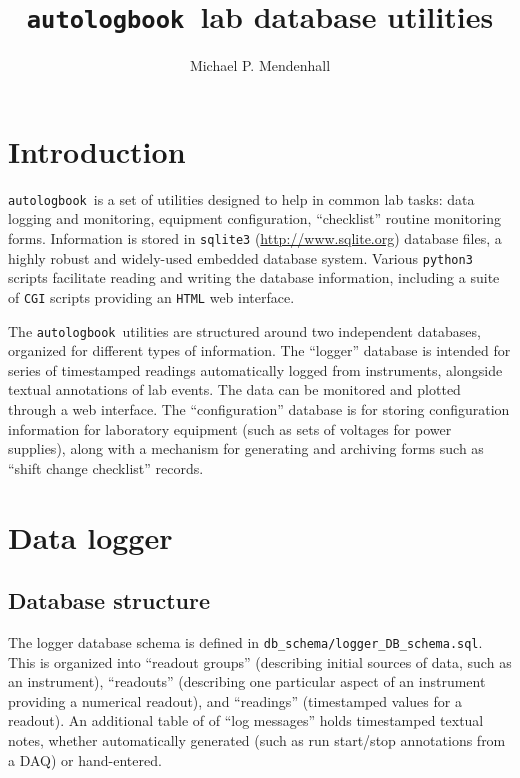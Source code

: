\documentclass[12pt,english]{article}
\newcommand{\cd}[1]{\texttt{#1}}
\newcommand{\alb}{\cd{autologbook}}
\begin{document}
\title{\alb\ lab database utilities}
\author{Michael P. Mendenhall}
\maketitle
\tableofcontents

\section{Introduction}

\alb\ is a set of utilities designed to help in common lab tasks:
	data logging and monitoring, equipment configuration, ``checklist'' routine monitoring forms.
Information is stored in \cd{sqlite3} (\url{http://www.sqlite.org}) database files,
	a highly robust and widely-used embedded database system.
Various \cd{python3} scripts facilitate reading and writing the database information,
	including a suite of \cd{CGI} scripts providing an \cd{HTML} web interface.

The \alb\ utilities are structured around two independent databases,
	organized for different types of information.
The ``logger'' database is intended for series of timestamped readings automatically logged
	from instruments, alongside textual annotations of lab events.
The data can be monitored and plotted through a web interface.
The ``configuration'' database is for storing configuration information for
	laboratory equipment (such as sets of voltages for power supplies),
	along with a mechanism for generating and archiving forms such as ``shift change checklist'' records.

%
%
%
\section{Data logger}

%
%
\subsection{Database structure}

The logger database schema is defined in \cd{db_schema/logger\_DB\_schema.sql}.
This is organized into ``readout groups'' (describing initial sources of data, such as an instrument),
	``readouts'' (describing one particular aspect of an instrument providing a numerical readout),
	and ``readings'' (timestamped values for a readout).
An additional table of of ``log messages'' holds timestamped textual notes,
	whether automatically generated (such as run start/stop annotations from a DAQ) or hand-entered.
\end{document}
